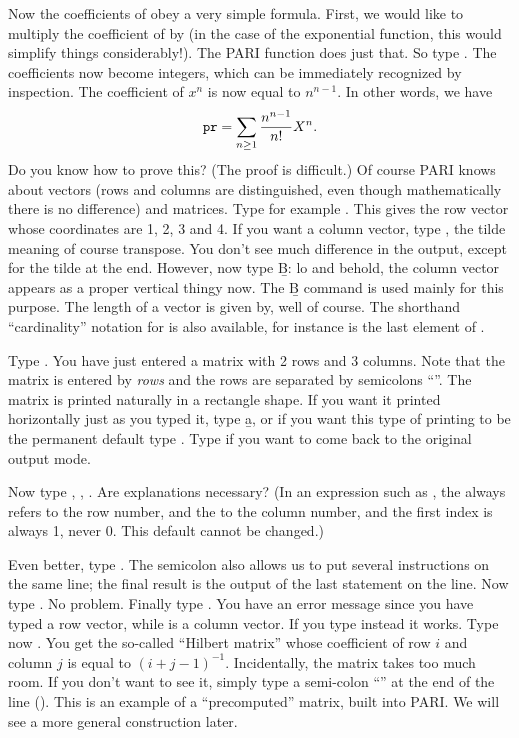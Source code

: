 Now the coefficients of  obey a very simple formula. First, we would
like to multiply the coefficient of  by  (in the case of
the exponential function, this would simplify things considerably!). The PARI
function  does just that. So type .
The coefficients now become integers, which can be immediately recognized by
inspection. The coefficient of $x^n$ is now equal to
$n^{n-1}$. In other words, we have
%
$${\tt pr} = \sum_{n\ge1}{{n^{n-1}}\over{n!}} X^{n}.$$
%
Do you know how to prove this? (The proof is difficult.)
\smallskip
%
Of course PARI knows about vectors (rows and columns are distinguished, even
though mathematically there is no difference) and matrices. Type for example
\kbd{[1,2,3,4]}. This gives the row vector whose coordinates are 1, 2, 3 and
4.  If you want a column vector, type \kbd{[1,2,3,4]\til}, the tilde meaning
of course transpose. You don't see much difference in the output, except for
the tilde at the end. However, now type \b{B}: lo and behold, the column
vector appears as a proper vertical thingy now. The \b{B} command is used
mainly for this purpose. The length of a vector is given by, well
 of course. The shorthand ``cardinality'' notation  for
 is also available, for instance  is the last
element of .

Type . You have just entered a matrix with 2 rows and
3 columns. Note that the matrix is entered by \emph{rows} and the rows are
separated by semicolons ``\kbd{;}''. The matrix is printed naturally in a
rectangle shape. If you want it printed horizontally just as you typed it,
type \b{a}, or if you want this type of printing to be the permanent default
type . Type  if you want to
come back to the original output mode.

Now type , , . Are explanations necessary?
(In an expression such as , the  always refers to the
row number, and the  to the column number, and the first index is
always 1, never 0. This default cannot be changed.)

Even better, type . The semicolon also allows us to put
several instructions on the same line; the final result is the output of
the last statement on the line. Now type . No
problem. Finally type . You have an error message since you
have typed a row vector, while  is a column vector. If you type
instead  it works. \smallskip
%
\label{se:types}
Type now . You get the so-called ``Hilbert matrix''
whose coefficient of row $i$ and column $j$ is equal to $(i+j-1)^{-1}$.
Incidentally, the matrix  takes too much room. If you don't want to
see it, simply type a semi-colon ``\kbd{;}'' at the end of the line
(). This is an example of a ``precomputed'' matrix,
built into PARI. We will see a more general construction later.

